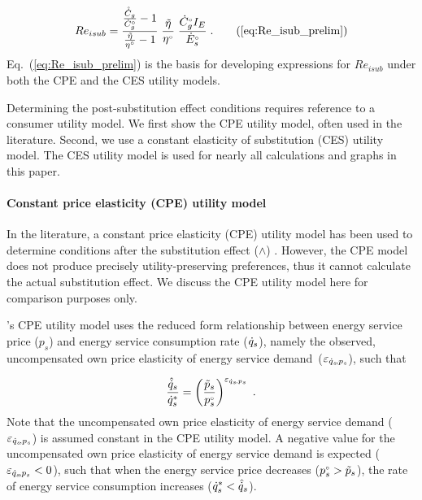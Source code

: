 \begin{equation}
  Re_{isub} = \frac{\frac{\rasub{C}_g}{\rorig{C}_g} - 1}{\etaratiostacked - 1} \; 
                          \etaratiostacked \; 
                          \frac{\rbempl{C}_g I_E}{\rbempl{E}_s} \; .
                              \tag{\ref{eq:Re_isub_prelim}}
\end{equation}
%
Eq.~(\ref{eq:Re_isub_prelim}) is the basis for
developing expressions for $Re_{isub}$ under both the 
CPE and the CES utility models.

Determining the post-substitution effect conditions
requires reference to a consumer utility model.
We first show the CPE utility model, often used in the literature. 
Second, we use a constant elasticity of substitution (CES)
utility model. 
The CES utility model is used for nearly all calculations and graphs
in this paper.


\paragraph{Constant price elasticity (CPE) utility model} 
\label{sec:Resub_approximate_method}

In the literature, a constant price elasticity (CPE) utility model
has been used to determine 
conditions after the substitution effect ($\wedge$)
\citep[p.~17, footnote~43]{Borenstein:2015aa}.
However, the CPE model does not produce precisely
utility-preserving preferences, 
thus it cannot calculate the actual substitution effect.
We discuss the CPE utility model here for 
comparison purposes only.

\citeauthor{Borenstein:2015aa}'s CPE utility model
uses the reduced form relationship between 
energy service price ($p_s$) and 
energy service consumption rate ($\dot{q}_s$), 
namely the observed, uncompensated own price elasticity of energy service demand~($\varepsilon_{\dot{q}_s\!,p_s}$), such that

\begin{equation}
  \frac{\hat{\dot{q}}_s}{{\dot{q}}^*_s} = \left( \frac{\tilde{p}_s}{{}{p}^{\scriptscriptstyle \circ}_s} \right)^{\varepsilon_{\dot{q}_s\!,p_s}} \; .
\end{equation}
%
Note that the uncompensated own price elasticity
of energy service demand ($\varepsilon_{\dot{q}_s\!,p_s}$)
is assumed constant in the CPE utility model.  
A negative value for the
uncompensated own price elasticity of energy service demand
is expected ($\varepsilon_{\dot{q}_s\!,p_s} < 0$),
such that when the energy service price decreases 
(${}{p}^{\scriptscriptstyle \circ}_s > \tilde{p}_s $),
the rate of energy service consumption increases 
(${\dot{q}}^*_s < \hat{\dot{q}}_s$).

